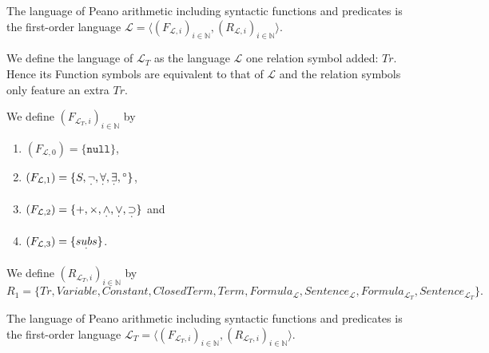 \begin{definition}\label{def:L}
  \leanok
    The language of Peano arithmetic including syntactic functions and predicates is the first-order language $\mathcal{L} = \langle (F_{\mathcal{L},i})_{i \in \mathbb{N}}, (R_{\mathcal{L},i})_{i \in \mathbb{N}} \rangle$.
\end{definition}

We define the language of $\mathcal{L}_T$ as the language $\mathcal{L}$ one relation symbol added: $Tr$. Hence its Function symbols are equivalent to that of $\mathcal{L}$ and the relation symbols only feature an extra $Tr$.

\begin{definition}\label{def:L_T-Func}
  \leanok
  We define $(F_{\mathcal{L}_T,i})_{i \in \mathbb{N}}$ by
  \begin{enumerate}
  \item $(F_{\mathcal{L},0}) = \{\texttt{null}\}$,
  \item $(F_{\mathcal{L},1}) = \{S, \underset{^{\boldsymbol{\cdot}}}{\neg} , \underset{^{\boldsymbol{\cdot}}}{\forall}, \underset{^{\boldsymbol{\cdot}}}{\exists}, {^\circ}\}$,
  \item $(F_{\mathcal{L},2}) = \{+,\times, \underset{^{\boldsymbol{\cdot}}}{\wedge}, \underset{^{\boldsymbol{\cdot}}}{\vee}, \underset{^{\boldsymbol{\cdot}}}{\supset}\}$ and
  \item $(F_{\mathcal{L},3}) = \{\underset{^{\boldsymbol{\cdot}}}{subs}\}$.
  \end{enumerate}
\end{definition}

\begin{definition}\label{def:L_T-Rel}
  \leanok
  We define $(R_{\mathcal{L}_T,i})_{i \in \mathbb{N}}$ by \[R_1 = \{Tr,Variable, Constant, ClosedTerm, Term, Formula_{\mathcal{L}}, Sentence_{\mathcal{L}}, Formula_{\mathcal{L}_T}, Sentence_{\mathcal{L}_T}\}.\]
\end{definition}

\begin{definition}\label{def:L_T}
  \leanok
    The language of Peano arithmetic including syntactic functions and predicates is the first-order language $\mathcal{L}_T = \langle (F_{\mathcal{L}_T,i})_{i \in \mathbb{N}}, (R_{\mathcal{L}_T,i})_{i \in \mathbb{N}} \rangle$.
\end{definition}

